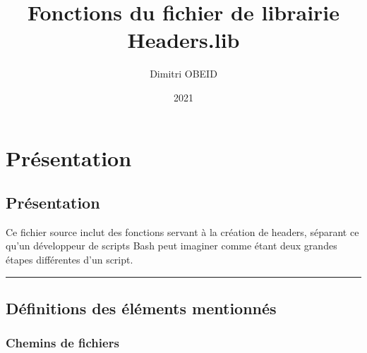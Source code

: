 \documentclass[a4paper,10pt]{article}
\title{\color{red}Fonctions du fichier de librairie \color{lime}Headers.lib}\color{white}
\author{Dimitri OBEID}
\date{2021}
\begin{document}
\maketitle
\newpage

\hypertarget{contents}{}
\tableofcontents
\newpage

\color{red}
\section{Présentation}\color{white}

\color{green}
\subsection{Présentation}\color{white}

\begin{justify}
    Ce fichier source inclut des fonctions servant à la création de headers, séparant ce qu'un développeur de scripts Bash peut imaginer comme étant deux grandes étapes différentes d'un script.
\end{justify}




\color{green}\par\noindent\rule{\textwidth}{0.4pt}\color{white}

\color{green}
\subsection{Définitions des éléments mentionnés}\color{white}

\color{blue}
\subsubsection{Chemins de fichiers}\color{white}
\end{document}

